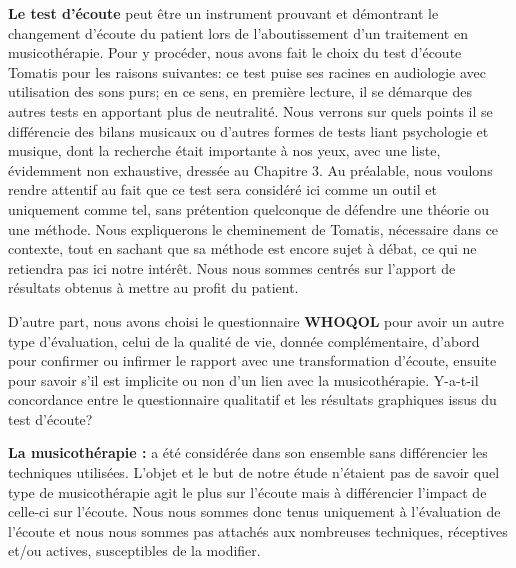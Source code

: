  
 
 
 \textbf { Le test d'écoute}  peut être un instrument prouvant et démontrant le changement d'écoute du 
 patient
 lors de l'aboutissement d'un traitement en musicothérapie.
 Pour y procéder, nous  avons fait le choix du test d'écoute Tomatis pour les raisons suivantes:  ce test 
 puise ses racines  en 
 audiologie avec utilisation des sons purs; en ce sens, en première lecture, il se démarque des autres 
 tests en apportant plus de neutralité. Nous verrons sur quels points il se différencie des bilans musicaux 
 ou 
 d'autres formes de tests liant psychologie et musique, dont la recherche était importante à nos yeux, 
 avec une liste, 
 évidemment non exhaustive, dressée au Chapitre 3. 
  Au préalable, nous voulons rendre attentif au fait que ce test sera considéré ici 
 comme un outil et uniquement comme tel, sans prétention quelconque de défendre une théorie ou une 
 méthode. Nous expliquerons le cheminement de Tomatis, nécessaire dans ce contexte, tout en  sachant 
 que sa méthode  est 
 encore sujet à débat, ce qui ne retiendra pas ici notre intérêt. Nous nous sommes centrés sur l'apport de 
 résultats obtenus à mettre 
 au profit du patient.
 
 D'autre part, nous avons choisi le questionnaire \textbf {WHOQOL} pour avoir un autre type 
 d'évaluation, celui 
 de la qualité de vie, donnée complémentaire, d'abord  pour confirmer ou infirmer le rapport avec une  
 transformation d'écoute, ensuite pour savoir s'il est implicite  ou non d'un lien avec la musicothérapie.
 Y-a-t-il concordance entre  le questionnaire qualitatif  et les résultats graphiques issus du test d'écoute?
 
  \textbf{La musicothérapie :}  a été considérée dans son ensemble sans 
 différencier les 
 techniques utilisées.
  L'objet et le but de notre étude n'étaient pas de savoir quel  type de 
  musicothérapie 
  agit le plus sur l'écoute mais à différencier l'impact de celle-ci sur l'écoute. Nous nous sommes donc 
  tenus uniquement  à l'évaluation de l'écoute et nous nous sommes pas attachés  aux nombreuses 
  techniques, réceptives et/ou actives, susceptibles de la modifier.

